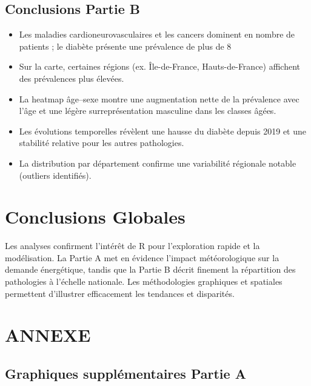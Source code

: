 \documentclass[12pt,a4paper]{article}
\begin{document}
\subsection{Conclusions Partie B}
\begin{itemize}
  \item Les maladies cardioneurovasculaires et les cancers dominent en nombre de patients ; le diabète présente une prévalence de plus de 8 %
  \item Sur la carte, certaines régions (ex. Île-de-France, Hauts-de-France) affichent des prévalences plus élevées.  
  \item La heatmap âge–sexe montre une augmentation nette de la prévalence avec l'âge et une légère surreprésentation masculine dans les classes âgées.  
  \item Les évolutions temporelles révèlent une hausse du diabète depuis 2019 et une stabilité relative pour les autres pathologies.  
  \item La distribution par département confirme une variabilité régionale notable (outliers identifiés).  
\end{itemize}

\section*{Conclusions Globales}
Les analyses confirment l'intérêt de R pour l'exploration rapide et la modélisation. La Partie A met en évidence l'impact météorologique sur la demande énergétique, tandis que la Partie B décrit finement la répartition des pathologies à l'échelle nationale. Les méthodologies graphiques et spatiales permettent d'illustrer efficacement les tendances et disparités.

\newpage

\section{ANNEXE}

\subsection{Graphiques supplémentaires Partie A}
\end{document}
